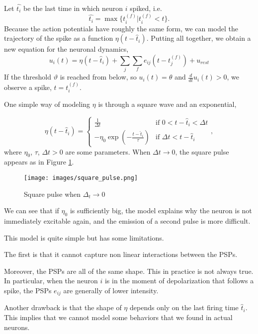 \documentclass[oneside]{book}
\theoremstyle{definition}
\theoremstyle{plain}
\begin{document}
Let $\hat{t_i}$ be the last time in which neuron $i$ spiked, i.e. 
\[\hat{t_i}=\max\{t_i^{(f)} | t_{i}^{(f)}<t\}.\]
Because the action potentials have roughly the same form, we can model the trajectory of the spike as a function $\eta(t- \hat{t}_i)$. Putting all together, we obtain a new equation for the neuronal dynamics,
\begin{equation}
    \label{eqn:spiking_neuron}
     u_i(t)=\eta(t-\hat{t}_i)+ \sum_{j}\sum_{f} e_{ij}(t-t_j^{(f)}) + u_{rest}
\end{equation}
If the threshold $\vartheta$ is reached from below, so $u_i(t)=\theta$ and $\frac{d}{dt}u_i(t)>0$, we observe a spike, $t=t_i^{(f)}$. 

One simple way of modeling $\eta$ is through a square wave and an exponential,

\begin{equation}
    \eta(t-\hat{t}_i) =
    \begin{cases}
     \frac{1}{\Delta t}  &\text{if } 0<t-
        \hat{t}_i<\Delta t \\
    -\eta_0 \exp\left(  -\frac{t-\hat{t}_i}{\tau} \right)  &\text{if } \Delta t < t- \hat{t}_i
    \end{cases},
\end{equation} 
where $\eta_0$, $\tau$, $\Delta t>0$ are some parameters.
When $\Delta t\to 0$, the square pulse appears as in Figure \ref{fig:square-pulse}.
\begin{figure}
    \centering
    \texttt{[image: images/square\_pulse.png]}
    \caption{Square pulse when $\Delta_t\to 0$}
    \label{fig:square-pulse}
\end{figure}
We can see that if $\eta_0$ is sufficiently big, the model explains why the neuron is not immediately excitable again, and the emission of a second pulse is more difficult.

This model is quite simple but has some limitations.

The first is that it cannot capture non linear interactions between the PSPs.

Moreover, the PSPs are all of the same shape. This in practice is not always true. In particular, when the neuron $i$ is in the moment of depolarization that follows a spike, the PSPs $e_{ij}$ are generally of lower intensity.

Another drawback is that the shape of $\eta$ depends only on the last firing time $\hat{t}_i$. This implies that we cannot model some behaviors that we found in actual neurons.
\end{document}
